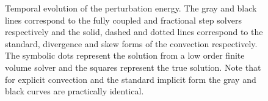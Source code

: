 \begin{figure}
 \centering
 \caption{ Temporal evolution of the perturbation energy. The gray and black lines correspond to the fully coupled and fractional step solvers respectively and the solid, dashed and dotted lines correspond to the standard, divergence and skew forms of the convection respectively. The symbolic dots represent the solution from a low order finite volume solver and the squares represent the true solution. Note that for explicit convection and the standard implicit form the gray and black curves are practically identical. }
\label{fig:OS_long_time}
\end{figure}


